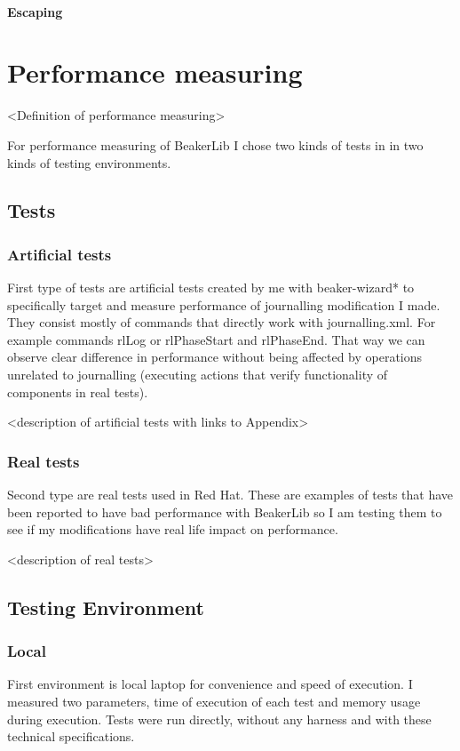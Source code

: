 \subsubsection{Escaping}



\chapter{Performance measuring}
<Definition of performance measuring>

For performance measuring of BeakerLib I chose two kinds of tests in in two kinds of testing environments.

\section{Tests}

\subsection{Artificial tests}
First type of tests are artificial tests created by me with beaker-wizard* to specifically target and measure performance of journalling modification I made. They consist mostly of commands that directly work with journalling.xml. For example commands rlLog or rlPhaseStart and rlPhaseEnd. That way we can observe clear difference in performance without being affected by operations unrelated to journalling (executing actions that verify functionality of components in real tests). 

<description of artificial tests with links to Appendix>

\subsection{Real tests}
Second type are real tests used in Red Hat. These are examples of tests that have been reported to have bad performance with BeakerLib so I am testing them to see if my modifications have real life impact on performance.

<description of real tests>

\section{Testing Environment}

\subsection{Local}
First environment is local laptop for convenience and speed of execution. I measured  two parameters, time of execution of each test and memory usage during execution. Tests were run directly, without any harness and with these technical specifications. 

